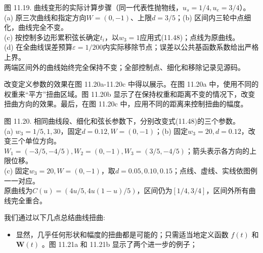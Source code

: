 \documentclass[../main.tex]{subfiles}
\begin{document}
\begin{center}
\begin{minipage}{37cm}
\centering
{}
\par\medskip
{}
\par\smallskip
图 11.19. 曲线变形的实际计算步骤（同一代表性抛物线，$u_s=1/4,u_e=3/4$）。\\
(a) 原三次曲线和指定方向$W=(0,-1)$、上限$d=3/5$；(b) 区间内三轮中点细化，曲线完全不变。\\
(c) 按控制多边形累积弦长确定$t_i$，以$w_3=1$应用式(11.48)；点线为原曲线。\\
(d) 在全曲线误差预算$\varepsilon=1/200$内实际移除节点；误差以公共基函数系数给出严格上界。\\
两端区间外的曲线始终完全保持不变；全部控制点、细化和移除记录见源码。
\end{minipage}
\end{center}

改变定义参数的效果在图 11.20a-11.20c 中得以展示。在图 11.20a 中，使用不同的权重来“平方”扭曲区域。图 11.20b 显示了在保持权重和距离不变的情况下，改变扭曲方向的效果。最后，在图 11.20c 中，应用不同的距离来控制扭曲的幅度。

\begin{center}
\begin{minipage}{37cm}
\centering
{}
\par\smallskip
图 11.20. 相同曲线段、细化和弦长参数下，分别改变式(11.48)的三个参数。\\
(a) $w_3=1/5,1,30$，固定$d=0.12,W=(0,-1)$；(b) 固定$w_3=20,d=0.12$，改变三个单位方向。\\
$W_1=(-3/5,-4/5),W_2=(0,-1),W_3=(3/5,-4/5)$；箭头表示各方向的上限位移。\\
(c) 固定$w_3=20,W=(0,-1)$，取$d=0.05,0.10,0.15$；点线、虚线、实线依图例一一对应。\\
原曲线为$C(u)=(4u/5,4u(1-u)/5)$，区间仍为$[1/4,3/4]$，区间外所有曲线完全重合。
\end{minipage}
\end{center}

我们通过以下几点总结曲线扭曲:

\begin{itemize}
\item 显然，几乎任何形状和幅度的扭曲都是可能的；只需适当地定义函数 \(f\left( t\right)\) 和 \(\mathbf{W}\left( t\right)\) 。图 11.21a 和 11.21b 显示了两个进一步的例子；
\end{itemize}
\end{document}
